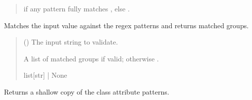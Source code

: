 \documentclass[letterpaper,10pt,english]{sphinxmanual}
\begin{document}
\begin{fulllineitems}
\begin{fulllineitems}
\begin{quote}
\begin{description}
\sphinxAtStartPar
{} if any pattern fully matches , else .

\end{description}\end{quote}

\end{fulllineitems}


\begin{fulllineitems}
\label{\detokenize{apache_commons_validator_python.routines:apache_commons_validator_python.routines.regex_validator.RegexValidator.match}}
\pysigstartsignatures
{}
\pysigstopsignatures
\sphinxAtStartPar
Matches the input value against the regex patterns and returns matched
groups.
\begin{quote}\begin{description}
\sphinxAtStartPar
{} () \textendash{} The input string to validate.

\sphinxAtStartPar
A list of matched groups if valid; otherwise .

\sphinxAtStartPar
list{[}str{]} | None

\end{description}\end{quote}

\end{fulllineitems}


\begin{fulllineitems}
\label{\detokenize{apache_commons_validator_python.routines:id34}}
\pysigstartsignatures
{}
\pysigstopsignatures
\sphinxAtStartPar
Returns a shallow copy of the class attribute patterns.


\end{fulllineitems}
\end{fulllineitems}
\end{document}
